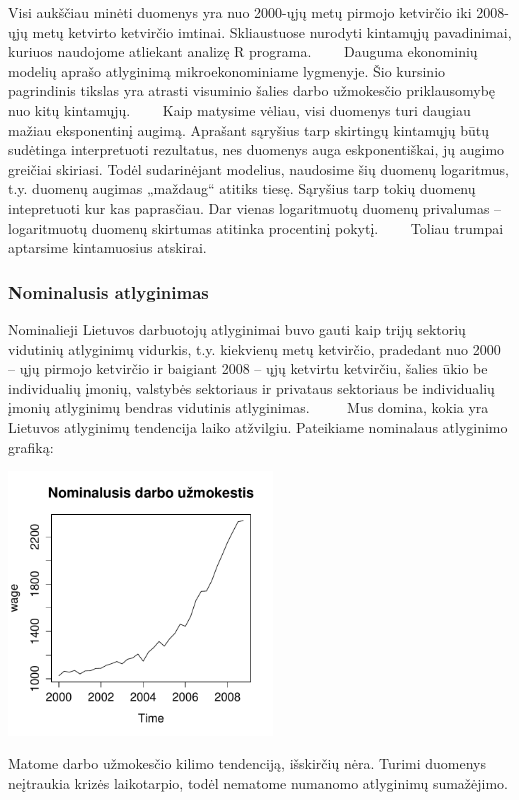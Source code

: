 \documentclass[12pt,a4paper]{article}
\theoremstyle{change}\newtheorem{salyga}{Uždavinys}
\begin{document}
Visi aukščiau minėti duomenys yra nuo 2000-ųjų metų pirmojo ketvirčio iki 2008-ųjų metų ketvirto ketvirčio imtinai. Skliaustuose nurodyti kintamųjų pavadinimai, kuriuos naudojome atliekant analizę R programa. 
\vskip 8pt
$\qquad $Dauguma ekonominių modelių aprašo atlyginimą mikroekonominiame lygmenyje. Šio kursinio pagrindinis tikslas yra atrasti visuminio šalies darbo užmokesčio priklausomybę nuo kitų kintamųjų.
\vskip 8pt
$\qquad $Kaip matysime vėliau, visi duomenys turi daugiau mažiau eksponentinį augimą. Aprašant sąryšius tarp skirtingų kintamųjų būtų sudėtinga interpretuoti rezultatus, nes duomenys auga eskponentiškai, jų augimo greičiai skiriasi. Todėl sudarinėjant modelius, naudosime šių duomenų logaritmus, t.y. duomenų augimas „maždaug“ atitiks tiesę. Sąryšius tarp tokių duomenų intepretuoti kur kas paprasčiau. Dar vienas logaritmuotų duomenų privalumas – logaritmuotų duomenų skirtumas atitinka procentinį pokytį.
\vskip 8pt
$\qquad $Toliau trumpai aptarsime kintamuosius atskirai. 






\subsubsection{Nominalusis atlyginimas}

\hspace{40pt}Nominalieji Lietuvos darbuotojų atlyginimai buvo gauti kaip trijų sektorių vidutinių atlyginimų vidurkis, t.y. kiekvienų metų ketvirčio, pradedant nuo 2000 – ųjų pirmojo ketvirčio ir baigiant 2008 – ųjų ketvirtu ketvirčiu, šalies ūkio be individualių įmonių, valstybės sektoriaus ir privataus sektoriaus be individualių įmonių atlyginimų bendras vidutinis atlyginimas.
\vskip 8pt
$\qquad$ Mus domina, kokia yra Lietuvos atlyginimų tendencija laiko atžvilgiu. Pateikiame nominalaus atlyginimo grafiką:
\vskip 8pt
\begin{center}
\includegraphics[width=70mm,height=70mm]{nwage}
\end{center}
Matome darbo užmokesčio kilimo tendenciją, išskirčių nėra. Turimi duomenys neįtraukia krizės laikotarpio, todėl nematome  numanomo atlyginimų sumažėjimo.  
\vskip 8pt
\end{document}
